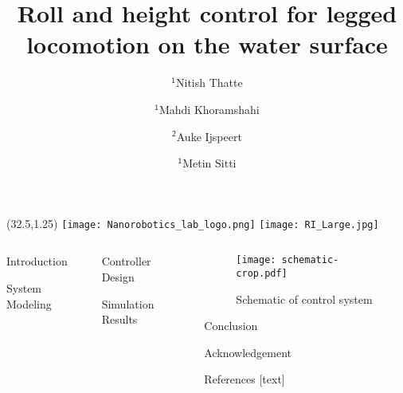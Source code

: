 \documentclass[final]{beamer}
\title{Roll and height control for legged locomotion on the water surface}
\author{$\mathsf{^1}$Nitish Thatte \and $\mathsf{^1}$Mahdi Khoramshahi \and $\mathsf{^2}$Auke Ijspeert \and  $\mathsf{^1}$Metin Sitti}
\institute{$\mathsf{^1}$Carnegie Mellon University \hspace{1EM} $\mathsf{^2}$\'{E}cole Polytechnique F\'{e}d\'{e}rale de Lausanne
}
\begin{document}
\begin{textblock}{12}(32.5,1.25)
    \texttt{[image: Nanorobotics\_lab\_logo.png]} 
    \texttt{[image: RI\_Large.jpg]}
\end{textblock}

\begin{frame}{} 
    \begin{columns}[t]
        \begin{column}{.3\linewidth}
            \begin{block}{Introduction}
                
            \end{block}
            
            \vspace{1in}
            \begin{block}{System Modeling}
                
            \end{block}
        \end{column}
        \begin{column}{.3\linewidth}
            \begin{block}{Controller Design}
                
            \end{block}
            \begin{block}{Simulation Results}
                
            \end{block}
        \end{column}
        \begin{column}{.3\linewidth}
            \begin{figure}[h]
                \centering
                \texttt{[image: schematic-crop.pdf]}
                \caption{\textrm{Schematic of control system}}
            \end{figure}

            \begin{block}{Conclusion}
                
            \end{block}
            \vspace{0.5in}

            \begin{block}{Acknowledgement}
                \small
                
            \end{block}
            \begin{block}{References}
                \small
                \vspace{-.25in}
                [text] 
                
                
            \end{block}
        \end{column}
    \end{columns}
\end{frame}
\end{document}
